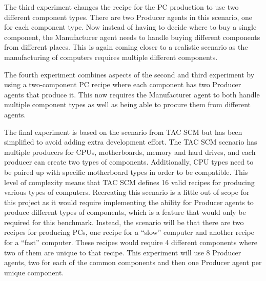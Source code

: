 The third experiment changes the recipe for the PC production to use two different component types.
There are two Producer agents in this scenario, one for each component type.
Now instead of having to decide where to buy a single component, the Manufacturer agent needs to handle buying different components from different places.
This is again coming closer to a realistic scenario as the manufacturing of computers requires multiple different components.

The fourth experiment combines aspects of the second and third experiment by using a two-component PC recipe where each component has two Producer agents that produce it.
This now requires the Manufacturer agent to both handle multiple component types as well as being able to procure them from different agents.

The final experiment is based on the scenario from TAC SCM but has been simplified to avoid adding extra development effort.
The TAC SCM scenario has multiple producers for CPUs, motherboards, memory and hard drives, and each producer can create two types of components.
Additionally, CPU types need to be paired up with specific motherboard types in order to be compatible.
This level of complexity means that TAC SCM defines 16 valid recipes for producing various types of computers.
Recreating this scenario is a little out of scope for this project as it would require implementing the ability for Producer agents to produce different types of components, which is a feature that would only be required for this benchmark.
Instead, the scenario will be that there are two recipes for producing PCs, one recipe for a ``slow'' computer and another recipe for a ``fast'' computer.
These recipes would require 4 different components where two of them are unique to that recipe.
This experiment will use 8 Producer agents, two for each of the common components and then one Producer agent per unique component.
